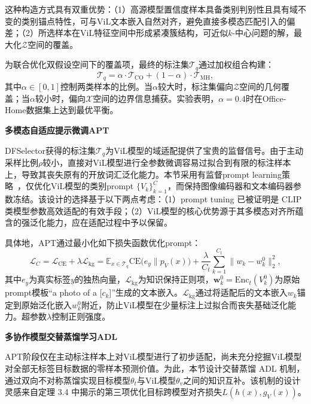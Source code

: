 这种构造方式具有双重优势：（1）高源模型置信度样本具备类别判别性且具有域不变的类别锚点特性，可与ViL文本嵌入自然对齐，避免直接多模态匹配引入的偏差；（2）所选样本在ViL特征空间中形成紧凑簇结构，可近似$k$-中心问题的解，最大化$\mathcal{Z}$空间的覆盖。


为联合优化双假设空间下的覆盖项，最终的标注集$\mathcal{T}_q$通过加权组合构建：
\begin{equation}
\mathcal{T}_q = \alpha \cdot \mathcal{T}_{\text{CO}} + (1-\alpha)\cdot\mathcal{T}_{\text{MH}},
\label{eq:dfselector}
\end{equation}
其中$\alpha\in[0,1]$控制两类样本的比例。当$\alpha$较大时，标注集偏向$\mathcal{Z}$空间的几何覆盖；当$\alpha$较小时，偏向$\mathcal{X}$空间的边界信息捕获。实验表明，$\alpha=0.4$时在Office-Home数据集上达到最优平衡。

\noindent\textbf{多模态自适应提示微调APT}

DFSelector获得的标注集$\mathcal{T}_q$为ViL模型的域适配提供了宝贵的监督信号。由于主动采样比例$\rho$较小，直接对ViL模型进行全参数微调容易过拟合到有限的标注样本上，导致其丧失原有的开放词汇泛化能力。本节采用有监督prompt learning策略~\cite{zhou2022learning}，仅优化ViL模型的类别prompt $\{V_k\}_{k=1}^{C}$，而保持图像编码器和文本编码器参数冻结。该设计的选择基于以下两点考虑：（1）prompt tuning 已被证明是 CLIP 类模型参数高效适配的有效手段；（2）ViL模型的核心优势源于其多模态对齐所蕴含的强泛化能力，应在适配过程中予以保留。

具体地，APT通过最小化如下损失函数优化prompt：
\begin{equation}
\mathcal{L}_C = \mathcal{L}_{\text{CE}} + \lambda \mathcal{L}_{\text{kg}} = \mathbb{E}_{x\in\mathcal{T}_q}\mathrm{CE}\big(e_y \| p_V(x)\big) + \frac{\lambda}{C_t}\sum_{k=1}^{C_t}\|w_k - w_k^0\|_2^2,
\label{eq:apt_loss}
\end{equation}
其中$e_y$为真实标签$y$的独热向量，$\mathcal{L}_{\text{kg}}$为知识保持正则项，$\mathbf{w}_k^0=\mathrm{Enc}_t(V_k^0)$为原始prompt模板“a photo of a [$c_k$]”生成的文本嵌入。$\mathcal{L}_{\text{kg}}$通过将适配后的文本嵌入$w_k$锚定到原始泛化嵌入$w_k^0$附近，防止ViL模型在少量标注上过拟合而丧失基础泛化能力。超参数$\lambda$控制正则强度。

\noindent\textbf{多协作模型交替蒸馏学习ADL}

APT阶段仅在主动标注样本上对ViL模型进行了初步适配，尚未充分挖掘ViL模型对全部无标签目标数据的零样本预测价值。为此，本节设计交替蒸馏 ADL 机制，通过双向不对称蒸馏实现目标模型$\theta_t$与ViL模型$\theta_v$之间的知识互补。该机制的设计灵感来自定理 3.4 中揭示的第三项优化目标跨模型对齐损失$L(h(x),g_V(x))$。

